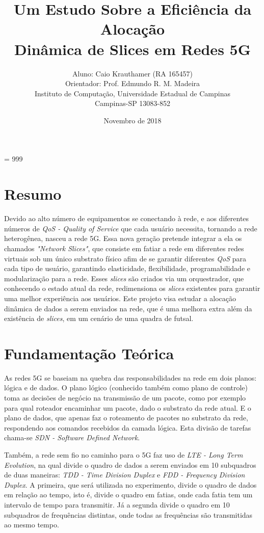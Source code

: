 \documentclass[12pt, a4paper]{article}
\title{Um Estudo Sobre a Eficiência da Alocação \\ Dinâmica de Slices em Redes 5G}
\author{Aluno: Caio Krauthamer (RA 165457) \\ Orientador: Prof. Edmundo R. M. Madeira \\[0.2cm] Instituto de Computação, Universidade Estadual de Campinas \\ Campinas-SP 13083-852}
\date{Novembro de 2018}
\begin{document}
\tolerance = 999
\sloppy

\maketitle

\section{Resumo}

Devido ao alto número de equipamentos se conectando à rede, e aos diferentes números de \textit{QoS - Quality of Service} que cada usuário necessita, tornando a rede heterogênea, nasceu a rede 5G. Essa nova geração pretende integrar a ela os chamados \textit{"Network Slices"}, que consiste em fatiar a rede em diferentes redes virtuais sob um único substrato físico afim de se garantir diferentes \textit{QoS} para cada tipo de usuário, garantindo elasticidade, flexibilidade, programabilidade e modularização para a rede. Esses \textit{slices} são criados via um orquestrador, que conhecendo o estado atual da rede, redimensiona os \textit{slices} existentes para garantir uma melhor experiência aos usuários. Este projeto visa estudar a alocação dinâmica de dados a serem enviados na rede, que é uma melhora extra além da existência de \textit{slices}, em um cenário de uma quadra de futsal.

\section{Fundamentação Teórica}

As redes 5G se baseiam na quebra das responsabilidades na rede em dois planos: lógica e de dados. O plano lógico (conhecido também como plano de controle) toma as decisões de negócio na transmissão de um pacote, como por exemplo para qual roteador encaminhar um pacote, dado o substrato da rede atual. E o plano de dados, que apenas faz o roteamento de pacotes no substrato da rede, respondendo aos comandos recebidos da camada lógica. Esta divisão de tarefas chama-se \textit{SDN - Software Defined Network}.

Também, a rede sem fio no caminho para o 5G faz uso de \textit{LTE - Long Term Evolution}, na qual divide o quadro de dados a serem enviados em 10 subquadros de duas maneiras: \textit{TDD - Time Division Duplex} e \textit{FDD - Frequency Division Duplex}. A primeira, que será utilizada no experimento, divide o quadro de dados em relação ao tempo, isto é, divide o quadro em fatias, onde cada fatia tem um intervalo de tempo para transmitir. Já a segunda divide o quadro em 10 subquadros de frequências distintas, onde todas as frequências são transmitidas ao mesmo tempo.
\end{document}
